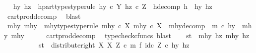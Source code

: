 \begin{isabellebody}
\ \isamarkupfalse%
\ hy\ hz\ \ h{\isacharunderscore}{\kern0pt}part{\isacharunderscore}{\kern0pt}types{\isacharbrackleft}{\kern0pt}type{\isacharunderscore}{\kern0pt}rule{\isacharbrackright}{\kern0pt}{\isacharcolon}{\kern0pt}\ {\isachardoublequoteopen}hy\ {\isasymin}\isactrlsub c\ Y{\isachardoublequoteclose}\ {\isachardoublequoteopen}hz\ {\isasymin}\isactrlsub c\ Z{\isachardoublequoteclose}\ \ h{\isacharunderscore}{\kern0pt}decomp{\isacharcolon}{\kern0pt}\ {\isachardoublequoteopen}h\ {\isacharequal}{\kern0pt}\ {\isasymlangle}hy{\isacharcomma}{\kern0pt}\ hz{\isasymrangle}{\isachardoublequoteclose}\isanewline
\ \ \ \ \isamarkupfalse%
\ cart{\isacharunderscore}{\kern0pt}prod{\isacharunderscore}{\kern0pt}decomp\ \isamarkupfalse%
\ blast\isanewline
\ \ \isamarkupfalse%
\ \isamarkupfalse%
\ mhy{}\ mhy{}\ \ mhy{\isacharunderscore}{\kern0pt}types{\isacharbrackleft}{\kern0pt}type{\isacharunderscore}{\kern0pt}rule{\isacharbrackright}{\kern0pt}{\isacharcolon}{\kern0pt}\ {\isachardoublequoteopen}mhy{}\ {\isasymin}\isactrlsub c\ X{\isachardoublequoteclose}\ {\isachardoublequoteopen}mhy{}\ {\isasymin}\isactrlsub c\ X{\isachardoublequoteclose}\ \ mhy{\isacharunderscore}{\kern0pt}decomp{\isacharcolon}{\kern0pt}\ \ {\isachardoublequoteopen}m\ {\isasymcirc}\isactrlsub c\ hy\ {\isacharequal}{\kern0pt}\ {\isasymlangle}mhy{}{\isacharcomma}{\kern0pt}\ mhy{}{\isasymrangle}{\isachardoublequoteclose}\isanewline
\ \ \ \ \isamarkupfalse%
\ cart{\isacharunderscore}{\kern0pt}prod{\isacharunderscore}{\kern0pt}decomp\ \isamarkupfalse%
\ {\isacharparenleft}{\kern0pt}typecheck{\isacharunderscore}{\kern0pt}cfuncs{\isacharcomma}{\kern0pt}\ blast{\isacharparenright}{\kern0pt}\isanewline
\isanewline
\ \ \isamarkupfalse%
\ {\isachardoublequoteopen}{\isasymlangle}s{\isacharcomma}{\kern0pt}t{\isasymrangle}\ {\isacharequal}{\kern0pt}\ {\isasymlangle}{\isasymlangle}mhy{}{\isacharcomma}{\kern0pt}\ hz{\isasymrangle}{\isacharcomma}{\kern0pt}\ {\isasymlangle}mhy{}{\isacharcomma}{\kern0pt}\ hz{\isasymrangle}{\isasymrangle}{\isachardoublequoteclose}\isanewline
\ \ \isamarkupfalse%
\ {\isacharminus}{\kern0pt}\isanewline
\ \ \ \ \isamarkupfalse%
\ {\isachardoublequoteopen}{\isasymlangle}s{\isacharcomma}{\kern0pt}t{\isasymrangle}\ {\isacharequal}{\kern0pt}\ {\isacharparenleft}{\kern0pt}distribute{\isacharunderscore}{\kern0pt}right\ X\ X\ Z\ {\isasymcirc}\isactrlsub c\ m\ {\isasymtimes}\isactrlsub f\ id\isactrlsub c\ Z{\isacharparenright}{\kern0pt}\ {\isasymcirc}\isactrlsub c\ {\isasymlangle}hy{\isacharcomma}{\kern0pt}\ hz{\isasymrangle}{\isachardoublequoteclose}\isanewline

\end{isabellebody}
